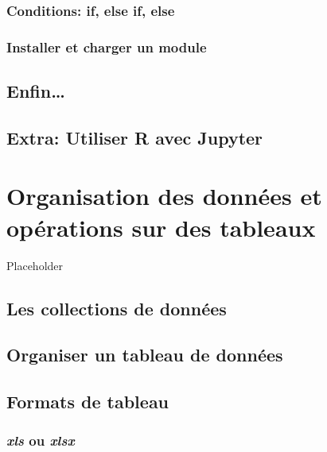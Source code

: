 \documentclass[]{book}
\begin{document}
\hypertarget{conditions-if-else-if-else}{%
\subsection{Conditions: if, else if,
else}\label{conditions-if-else-if-else}}

\hypertarget{installer-et-charger-un-module}{%
\subsection{Installer et charger un
module}\label{installer-et-charger-un-module}}

\hypertarget{enfin}{%
\section{Enfin\ldots{}}\label{enfin}}

\hypertarget{extra-jupyter}{%
\section{Extra: Utiliser R avec Jupyter}\label{extra-jupyter}}

\hypertarget{chapitre-tableaux}{%
\chapter{Organisation des données et opérations sur des
tableaux}\label{chapitre-tableaux}}

Placeholder

\hypertarget{les-collections-de-donnuxe9es-1}{%
\section{Les collections de
données}\label{les-collections-de-donnuxe9es-1}}

\hypertarget{organiser-un-tableau-de-donnuxe9es}{%
\section{Organiser un tableau de
données}\label{organiser-un-tableau-de-donnuxe9es}}

\hypertarget{formats-de-tableau}{%
\section{Formats de tableau}\label{formats-de-tableau}}

\hypertarget{xls-ou-xlsx}{%
\subsection{\texorpdfstring{\emph{xls} ou
\emph{xlsx}}{xls ou xlsx}}\label{xls-ou-xlsx}}
\end{document}
